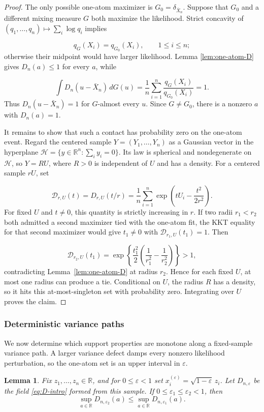 \documentclass[11pt]{article}
\newtheorem{lemma}[theorem]{Lemma}
\theoremstyle{definition}
\numberwithin{equation}{section}
\newcommand{\R}{\mathbb{R}}
\newcommand{\eps}{\varepsilon}
\begin{document}
\begin{proof}
The only possible one-atom maximizer is \(G_0=\delta_{\bar X_n}\). Suppose
that \(G_0\) and a different mixing measure \(G\) both maximize the
likelihood. Strict concavity of
\((q_1,\dots,q_n)\mapsto\sum_i\log q_i\) implies

\[
    q_G(X_i)=q_{G_0}(X_i),\qquad 1\le i\le n;
\]
otherwise their midpoint would have larger likelihood. Lemma
\ref{lem:one-atom-D} gives \(D_n(a)\le1\) for every \(a\), while

\[
    \int D_n(u-\bar X_n)\,dG(u)
    =\frac1n\sum_{i=1}^n\frac{q_G(X_i)}{q_{G_0}(X_i)}=1.
\]
Thus \(D_n(u-\bar X_n)=1\) for \(G\)-almost every \(u\). Since
\(G\ne G_0\), there is a nonzero \(a\) with \(D_n(a)=1\).

It remains to show that such a contact has probability zero on the one-atom
event. Regard the centered sample \(Y=(Y_1,\dots,Y_n)\) as a Gaussian vector
in the hyperplane \(\mathcal H=\{y\in\R^n:\sum_i y_i=0\}\). Its law is
spherical and nondegenerate on \(\mathcal H\), so \(Y=RU\), where \(R>0\)
is independent of \(U\) and has a density. For a centered sample \(rU\), set

\[
    \mathcal D_{r,U}(t)
    =D_{r,U}(t/r)
    =\frac1n\sum_{i=1}^n
      \exp\left(tU_i-\frac{t^2}{2r^2}\right).
\]
For fixed \(U\) and \(t\ne0\), this quantity is strictly increasing in \(r\).
If two radii \(r_1<r_2\) both admitted a second maximizer tied with the
one-atom fit, the KKT equality for that second maximizer would give
\(t_1\ne0\) with \(\mathcal D_{r_1,U}(t_1)=1\). Then

\[
 \mathcal D_{r_2,U}(t_1)
 =\exp\left\{\frac{t_1^2}{2}
       \left(\frac1{r_1^2}-\frac1{r_2^2}\right)\right\}>1,
\]
contradicting Lemma~\ref{lem:one-atom-D} at radius \(r_2\). Hence for each
fixed \(U\), at most one radius can produce a tie. Conditional on \(U\), the
radius \(R\) has a density, so it hits this at-most-singleton set with
probability zero. Integrating over \(U\) proves the claim.
\end{proof}

\subsubsection{Deterministic variance paths}

We now determine which support properties are monotone along a fixed-sample
variance path. A larger variance defect damps every nonzero likelihood
perturbation, so the one-atom set is an upper interval in \(\eps\).
\begin{lemma}
\label{lem:variance-monotonicity}
Fix \(z_1,\dots,z_n\in\R\), and for \(0\le\eps<1\) set
\(x_i^{(\eps)}=\sqrt{1-\eps}\,z_i\). Let \(D_{n,\eps}\) be the field
\eqref{eq:D-intro} formed from this sample. If
\(0\le\eps_1\le\eps_2<1\), then
\[
    \sup_{a\in\R}D_{n,\eps_2}(a)
    \le
    \sup_{a\in\R}D_{n,\eps_1}(a).
\]
\end{lemma}
\end{document}
